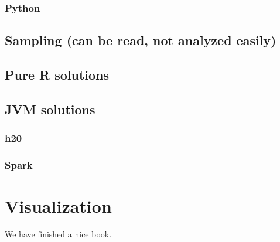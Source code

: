 \documentclass[]{book}
\theoremstyle{definition}
\theoremstyle{definition}
\theoremstyle{definition}
\theoremstyle{remark}
\begin{document}
\subsection{Python}\label{python}

\section{Sampling (can be read, not analyzed
easily)}\label{sampling-can-be-read-not-analyzed-easily}

\section{Pure R solutions}\label{pure-r-solutions}

\section{JVM solutions}\label{jvm-solutions}

\subsection{h20}\label{h20}

\subsection{Spark}\label{spark}

\chapter{Visualization}\label{visualization}

We have finished a nice book.


\end{document}
